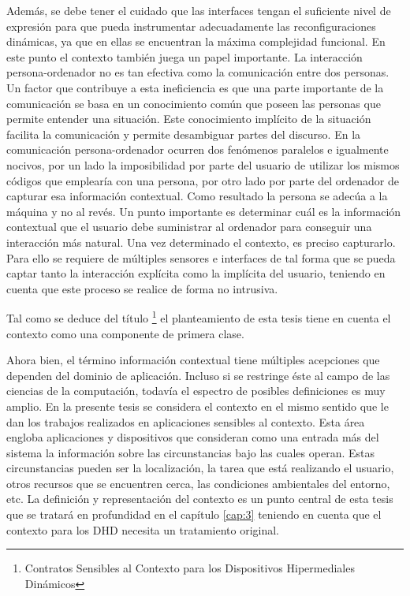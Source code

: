 {Además, se debe tener el cuidado que las interfaces tengan el suficiente nivel
de expresión para que pueda instrumentar adecuadamente las reconfiguraciones
dinámicas, ya que en ellas se encuentran la máxima complejidad
funcional. En este punto el contexto también juega un papel importante. La
interacción persona-ordenador no es tan efectiva como la comunicación entre dos
personas. Un factor que contribuye a esta ineficiencia es que una parte
importante de la comunicación se basa en un conocimiento común que poseen las
personas que permite entender una situación. Este conocimiento implícito de la
situación facilita la comunicación y permite desambiguar partes del discurso. En
la comunicación persona-ordenador ocurren dos fenómenos paralelos e igualmente
nocivos, por un lado la imposibilidad por parte del usuario de utilizar los
mismos códigos que emplearía con una persona, por otro lado por parte del
ordenador de capturar esa información contextual. Como resultado la persona se
adecúa a la máquina y no al revés. Un punto importante es determinar cuál es la
información contextual que el usuario debe suministrar al ordenador para
conseguir una interacción más natural. Una vez determinado el contexto, es
preciso capturarlo. Para ello se requiere de múltiples sensores e interfaces de
tal forma que se pueda captar tanto la interacción explícita como la implícita
del usuario, teniendo en cuenta que este proceso se realice de
forma no intrusiva.  

Tal como se deduce del título \footnote{Contratos Sensibles al Contexto
para los Dispositivos Hipermediales Dinámicos} el planteamiento de esta tesis
tiene en cuenta el contexto como una componente de primera clase.

Ahora bien, el término información contextual tiene múltiples acepciones
que dependen del dominio de aplicación. Incluso si se restringe éste al campo de
las ciencias de la computación, todavía el espectro de posibles definiciones es
muy amplio. En la presente tesis se considera el contexto en el mismo sentido
que le dan los trabajos realizados en aplicaciones sensibles al contexto. Esta
área engloba aplicaciones y dispositivos que consideran como una entrada más del
sistema la información sobre las circunstancias bajo las cuales operan. Estas
circunstancias pueden ser la localización, la tarea que está realizando el
usuario, otros recursos que se encuentren cerca, las condiciones ambientales del
entorno, etc. La definición y representación del contexto es un punto central de
esta tesis que se tratará en profundidad en el capítulo \ref{cap:3} teniendo en
cuenta que el contexto para los DHD necesita un tratamiento original. 

}
